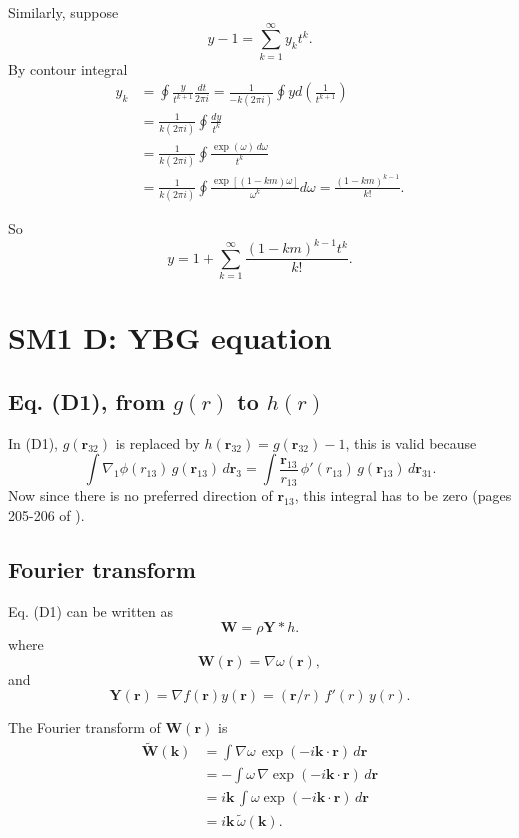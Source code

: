 \documentclass[preprint]{revtex4-1}
\numberwithin{equation}{subsection}
\numberwithin{table}{section}
\newcommand{\vct}[1]{\mathbf{#1}}
\providecommand{\vr}{} %
\renewcommand{\vr}{\vct{r}}
\newcommand{\vk}{\vct{k}}
\begin{document}
Similarly, suppose
\[
  y - 1
=
\sum_{k = 1}^\infty y_k t^k.
\]
By contour integral
\begin{align*}
y_k
&=
\oint \frac{y}{t^{k+1}} \frac{dt}{2\pi i}
=
\frac{1}{-k (2\pi i)} \oint y d\left(\frac{1}{t^{k+1}}\right)
\\
&=
\frac{1}{k (2\pi i)} \oint \frac{ dy }{t^{k}}
\\
&=
\frac{1}{k (2\pi i)} \oint \frac{ \exp(\omega) \, d\omega }{t^{k}}
\\
&=
\frac{1}{k (2\pi i)} \oint \frac{ \exp[(1 - k m) \omega]  }{\omega^{k}} d\omega
=
\frac{ (1-k m)^{k-1} }
     { k! }.
\end{align*}

So
\[
  y
=
1 + \sum_{k = 1}^\infty
\frac{ (1 - k m)^{k-1} t^k } { k! }.
\]



\section{SM1 D: YBG equation}

\subsection{Eq. (D1), from $g(r)$ to $h(r)$}

In (D1), $g(\vr_{32})$ is replaced by $h(\vr_{32}) = g(\vr_{32}) - 1$,
this is valid because
\[
  \int \nabla_1 \phi(r_{13}) \, g(\vr_{13}) \, d\vr_3
=
  \int \frac{ \vr_{13} } { r_{13} } \,
  \phi'(r_{13}) \, g(\vr_{13}) \, d\vr_{31}.
\]
Now since there is no preferred direction of $\vr_{13}$,
this integral has to be zero (pages 205-206 of \cite{hill}).



\subsection{Fourier transform}

Eq. (D1) can be written as
\[
  \vct{W}
=
\rho \vct{Y} * h.
\]
where
\[
  \vct{W}(\vr) = \nabla \omega(\vr),
\]
and
\[
  \vct{Y}(\vr) = \nabla f(\vr) y(\vr)
  = (\vr/r) \, f'(r) \, y(r).
\]

The Fourier transform of $\vct W(\vr)$ is
\begin{align*}
  \tilde{\vct{W}}(\vk)
&=
\int \nabla \omega \, \exp(-i\vk \cdot \vr) \, d\vr
\\
&=
-\int \omega \, \nabla \exp(-i\vk \cdot \vr) \, d\vr
\\
&=
i \vk \, \int \omega \exp(-i\vk \cdot \vr) \, d\vr
\\
&=
i \vk \, \tilde{\omega}(\vk).
\end{align*}
\end{document}
